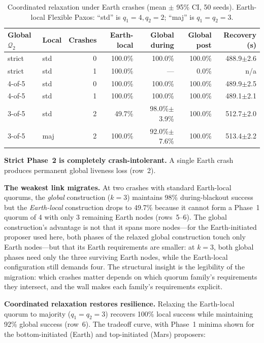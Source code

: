 \documentclass[11pt]{article}
\begin{document}
\begin{table}[t]
\centering
\small
\caption{Coordinated relaxation under Earth crashes (mean $\pm$ 95\% CI, 50 seeds). Earth-local Flexible Paxos: ``std'' is $q_1{=}4, q_2{=}2$; ``maj'' is $q_1{=}q_2{=}3$.}
\label{tab:relaxed}
\begin{tabular}{llrrrrr}
\toprule
Global $\mathcal{Q}_2$ & Local & Crashes & Earth-local & Global during & Global post & Recovery (s) \\
\midrule
strict & std & 0 & 100.0\% & 100.0\% & 100.0\% & 488.9$\pm$2.6 \\
strict & std & 1 & 100.0\% & --- & 0.0\% & n/a \\
4-of-5 & std & 0 & 100.0\% & 100.0\% & 100.0\% & 489.9$\pm$2.5 \\
4-of-5 & std & 1 & 100.0\% & 100.0\% & 100.0\% & 489.1$\pm$2.1 \\
3-of-5 & std & 2 & 49.7\% & 98.0\%$\pm$3.9\% & 100.0\% & 512.7$\pm$2.0 \\
3-of-5 & maj & 2 & 100.0\% & 92.0\%$\pm$7.6\% & 100.0\% & 513.4$\pm$2.2 \\
\bottomrule
\end{tabular}
\end{table}

\textbf{Strict Phase~2 is completely crash-intolerant.} A single Earth crash produces permanent global liveness loss (row~2).

\textbf{The weakest link migrates.} At two crashes with standard Earth-local quorums, the \emph{global} construction ($k = 3$) maintains 98\% during-blackout success but the \emph{Earth-local} construction drops to 49.7\% because it cannot form a Phase~1 quorum of 4 with only 3 remaining Earth nodes (rows~5--6). The global construction's advantage is not that it spans more nodes---for the Earth-initiated proposer used here, both phases of the relaxed global construction touch only Earth nodes---but that its Earth requirements are smaller: at $k = 3$, both global phases need only the three surviving Earth nodes, while the Earth-local configuration still demands four. The structural insight is the legibility of the migration: which crashes matter depends on which quorum family's requirements they intersect, and the wall makes each family's requirements explicit.

\textbf{Coordinated relaxation restores resilience.} Relaxing the Earth-local quorum to majority ($q_1 = q_2 = 3$) recovers 100\% local success while maintaining 92\% global success (row~6). The tradeoff curve, with Phase~1 minima shown for the bottom-initiated (Earth) and top-initiated (Mars) proposers:
\end{document}

